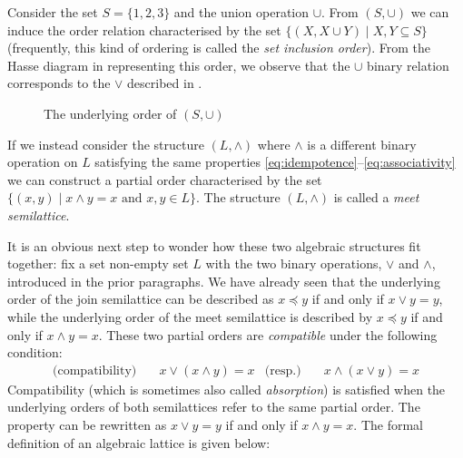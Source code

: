 \begin{example}
     Consider the set $S = \{1,2,3\}$ and the union operation $\cup$. From $(S, \cup)$ we can induce the order relation characterised by the set $\{(X, X \cup Y) \mid X,Y \subseteq S \}$ (frequently, this kind of ordering is called the \textit{set inclusion order}). From the Hasse diagram in  representing this order, we observe that the $\cup$ binary relation corresponds to the $\vee$ described in . 
%
\begin{figure}[H]
  \centering
  \caption{The underlying order of $(S, \cup)$}
  \label{figure:set-inclusion-order}
\end{figure}
\end{example}

If we instead consider the structure $(L, \wedge)$ where $\wedge$ is a different binary operation on $L$ satisfying the same properties \cref{eq:idempotence}--\cref{eq:associativity} we can construct a partial order characterised by the set $\{(x,y) \mid x \wedge y = x \text{ and } x,y \in L\}$. The structure $(L, \wedge)$ is called a \textit{meet semilattice}. 

It is an obvious next step to wonder how these two algebraic structures fit together: fix a set non-empty set $L$ with the two binary operations, $\vee$ and $\wedge$, introduced in the prior paragraphs. We have already seen that the underlying order of the join semilattice can be described as $x \preceq y$ if and only if $x \vee y = y$, while the underlying order of the meet semilattice is described by $x \preceq y$ if and only if $x \wedge y = x$. These two partial orders are \textit{compatible} under the following condition:
\begin{align}
     \text{(compatibility)} & \quad x \vee (x \wedge y) = x & \text{(resp.)}  & \quad x \wedge (x \vee y) = x
\end{align}
%
Compatibility (which is sometimes also called \textit{absorption}) is satisfied when the underlying orders of both semilattices refer to the same partial order. The property can be rewritten as $x \vee y = y$ if and only if $x \wedge y = x$. The formal definition of an algebraic lattice is given below: 

